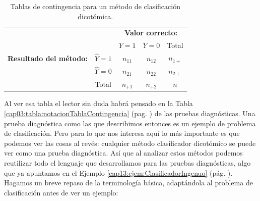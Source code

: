 \begin{table}[ht]
	\begin{center}
		\begin{tabular}{cc|c|c|c|}
			&\multicolumn{1}{c}{}&\multicolumn{3}{c}{\bf Valor correcto:}\\
			\cline{3-5}
			&\multicolumn{1}{c|}{}& $Y = 1$&  $Y = 0$& Total \\
			\cline{2-5}
			{\bf Resultado del método:}&\multicolumn{1}{|c|}{\rule{0cm}{0.5cm}$\hat{Y} = 1$}& $n_{11}$ & $n_{12}$ & $n_{1+}$ \\ %
			\cline{2-5}
			& \multicolumn{1}{|c|}{\rule{0cm}{0.5cm}$\hat{Y} = 0$ }& $n_{21}$ & $n_{22}$ &  $n_{2+}$\\ %
			\cline{2-5}
			& \multicolumn{1}{|c|}{Total} & $n_{+1}$ & $n_{+2}$ & $n$ \\
			\cline{2-5}
		\end{tabular}
	\end{center}
	\caption{Tablas de contingencia para un método de clasificación dicotómica.}
	\label{cap13:tabla:TablaContingenciaClasificadorDicotomico}
\end{table}

Al ver esa tabla el lector sin duda habrá pensado en la Tabla \ref{cap03:tabla:notacionTablaContingencia} (pag. \pageref{cap03:tabla:notacionTablaContingencia})  de las pruebas diagnósticas. Una prueba diagnóstica como las que describimos entonces es un ejemplo de problema de clasificación. Pero para lo que nos interesa aquí lo más importante es que podemos ver las cosas al revés: cualquier método clasificador dicotómico se puede ver como una prueba diagnóstica. Así que al analizar estos métodos podemos reutilizar todo el lenguaje que desarrollamos para las pruebas diagnósticas, algo que ya apuntamos en el Ejemplo \ref{cap13:ejem:ClasificadorIngenuo} (pág. \pageref{cap13:ejem:ClasificadorIngenuo}). Hagamos un breve repaso de la terminología básica, adaptándola al problema de clasificación antes de ver un ejemplo:

